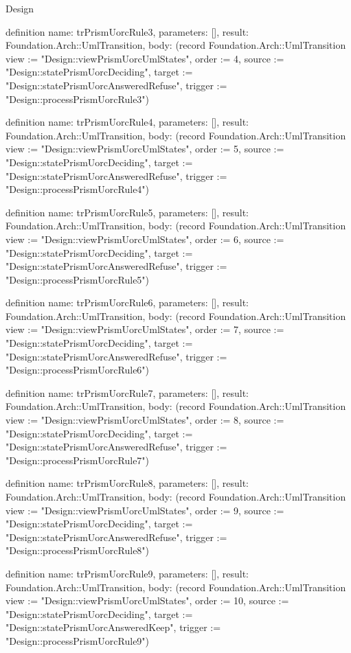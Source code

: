 \begin{lexlean}{Design}
\begin{semanticmodule}
definition{
  name: trPrismUorcRule3,
  parameters: [],
  result: Foundation.Arch::UmlTransition,
  body: (record Foundation.Arch::UmlTransition {view := "Design::viewPrismUorcUmlStates", order := 4, source := "Design::statePrismUorcDeciding", target := "Design::statePrismUorcAnsweredRefuse", trigger := "Design::processPrismUorcRule3"})
}

definition{
  name: trPrismUorcRule4,
  parameters: [],
  result: Foundation.Arch::UmlTransition,
  body: (record Foundation.Arch::UmlTransition {view := "Design::viewPrismUorcUmlStates", order := 5, source := "Design::statePrismUorcDeciding", target := "Design::statePrismUorcAnsweredRefuse", trigger := "Design::processPrismUorcRule4"})
}

definition{
  name: trPrismUorcRule5,
  parameters: [],
  result: Foundation.Arch::UmlTransition,
  body: (record Foundation.Arch::UmlTransition {view := "Design::viewPrismUorcUmlStates", order := 6, source := "Design::statePrismUorcDeciding", target := "Design::statePrismUorcAnsweredRefuse", trigger := "Design::processPrismUorcRule5"})
}

definition{
  name: trPrismUorcRule6,
  parameters: [],
  result: Foundation.Arch::UmlTransition,
  body: (record Foundation.Arch::UmlTransition {view := "Design::viewPrismUorcUmlStates", order := 7, source := "Design::statePrismUorcDeciding", target := "Design::statePrismUorcAnsweredRefuse", trigger := "Design::processPrismUorcRule6"})
}

definition{
  name: trPrismUorcRule7,
  parameters: [],
  result: Foundation.Arch::UmlTransition,
  body: (record Foundation.Arch::UmlTransition {view := "Design::viewPrismUorcUmlStates", order := 8, source := "Design::statePrismUorcDeciding", target := "Design::statePrismUorcAnsweredRefuse", trigger := "Design::processPrismUorcRule7"})
}

definition{
  name: trPrismUorcRule8,
  parameters: [],
  result: Foundation.Arch::UmlTransition,
  body: (record Foundation.Arch::UmlTransition {view := "Design::viewPrismUorcUmlStates", order := 9, source := "Design::statePrismUorcDeciding", target := "Design::statePrismUorcAnsweredRefuse", trigger := "Design::processPrismUorcRule8"})
}

definition{
  name: trPrismUorcRule9,
  parameters: [],
  result: Foundation.Arch::UmlTransition,
  body: (record Foundation.Arch::UmlTransition {view := "Design::viewPrismUorcUmlStates", order := 10, source := "Design::statePrismUorcDeciding", target := "Design::statePrismUorcAnsweredKeep", trigger := "Design::processPrismUorcRule9"})
}


\end{semanticmodule}
\end{lexlean}

